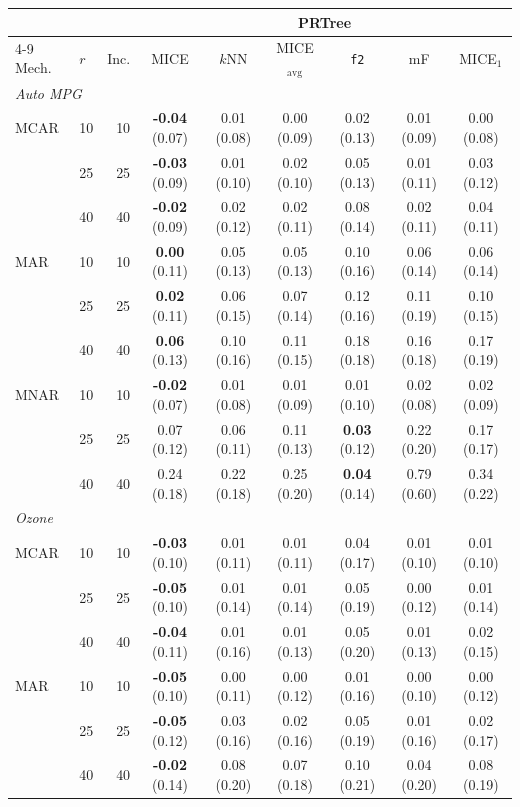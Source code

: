 \begin{tabular}{llrcccccc}
\toprule
 & & & \multicolumn{6}{c}{PRTree}\\
\cmidrule(lr){4-9}
Mech. & $r$ & Inc. & MICE & $k$NN & MICE$_{\mathrm{avg}}$ & \texttt{f2} & mF & MICE$_1$\\
\midrule
\multicolumn{9}{l}{\textit{Auto MPG}}\\
MCAR & 10 & 10 & \textbf{-0.04} (0.07) & 0.01 (0.08) & 0.00 (0.09) & 0.02 (0.13) & 0.01 (0.09) & 0.00 (0.08)\\
 & 25 & 25 & \textbf{-0.03} (0.09) & 0.01 (0.10) & 0.02 (0.10) & 0.05 (0.13) & 0.01 (0.11) & 0.03 (0.12)\\
 & 40 & 40 & \textbf{-0.02} (0.09) & 0.02 (0.12) & 0.02 (0.11) & 0.08 (0.14) & 0.02 (0.11) & 0.04 (0.11)\\
MAR & 10 & 10 & \textbf{0.00} (0.11) & 0.05 (0.13) & 0.05 (0.13) & 0.10 (0.16) & 0.06 (0.14) & 0.06 (0.14)\\
 & 25 & 25 & \textbf{0.02} (0.11) & 0.06 (0.15) & 0.07 (0.14) & 0.12 (0.16) & 0.11 (0.19) & 0.10 (0.15)\\
 & 40 & 40 & \textbf{0.06} (0.13) & 0.10 (0.16) & 0.11 (0.15) & 0.18 (0.18) & 0.16 (0.18) & 0.17 (0.19)\\
MNAR & 10 & 10 & \textbf{-0.02} (0.07) & 0.01 (0.08) & 0.01 (0.09) & 0.01 (0.10) & 0.02 (0.08) & 0.02 (0.09)\\
 & 25 & 25 & 0.07 (0.12) & 0.06 (0.11) & 0.11 (0.13) & \textbf{0.03} (0.12) & 0.22 (0.20) & 0.17 (0.17)\\
 & 40 & 40 & 0.24 (0.18) & 0.22 (0.18) & 0.25 (0.20) & \textbf{0.04} (0.14) & 0.79 (0.60) & 0.34 (0.22)\\
\midrule
\multicolumn{9}{l}{\textit{Ozone}}\\
MCAR & 10 & 10 & \textbf{-0.03} (0.10) & 0.01 (0.11) & 0.01 (0.11) & 0.04 (0.17) & 0.01 (0.10) & 0.01 (0.10)\\
 & 25 & 25 & \textbf{-0.05} (0.10) & 0.01 (0.14) & 0.01 (0.14) & 0.05 (0.19) & 0.00 (0.12) & 0.01 (0.14)\\
 & 40 & 40 & \textbf{-0.04} (0.11) & 0.01 (0.16) & 0.01 (0.13) & 0.05 (0.20) & 0.01 (0.13) & 0.02 (0.15)\\
MAR & 10 & 10 & \textbf{-0.05} (0.10) & 0.00 (0.11) & 0.00 (0.12) & 0.01 (0.16) & 0.00 (0.10) & 0.00 (0.12)\\
 & 25 & 25 & \textbf{-0.05} (0.12) & 0.03 (0.16) & 0.02 (0.16) & 0.05 (0.19) & 0.01 (0.16) & 0.02 (0.17)\\
 & 40 & 40 & \textbf{-0.02} (0.14) & 0.08 (0.20) & 0.07 (0.18) & 0.10 (0.21) & 0.04 (0.20) & 0.08 (0.19)\\

\end{tabular}
